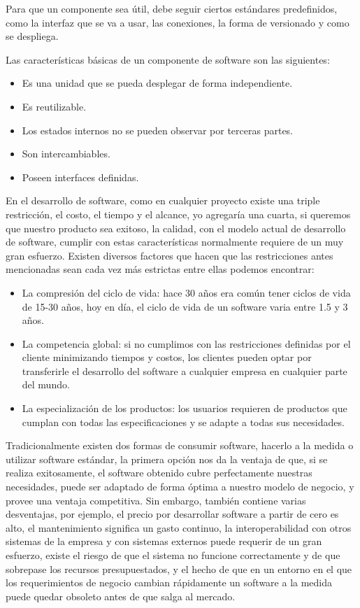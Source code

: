 \documentclass[12pt,a4paper,spanish,openany]{book}
\begin{document}
Para que un componente sea útil, debe seguir ciertos estándares predefinidos,
como la interfaz que se va a usar, las conexiones, la forma de versionado y como
se despliega.

Las características básicas de un componente de software son las siguientes:
\begin{itemize}
  \item Es una unidad que se pueda desplegar de forma independiente.
  \item Es reutilizable.
  \item Los estados internos no se pueden observar por terceras partes.
  \item Son intercambiables.
  \item Poseen interfaces definidas.
\end{itemize}




En el desarrollo de software, como en cualquier proyecto existe una triple
restricción, el costo, el tiempo y el alcance, yo agregaría una cuarta, si
queremos que nuestro producto sea exitoso, la calidad, con el modelo actual de
desarrollo de software, cumplir con estas características normalmente requiere
de un muy gran esfuerzo. Existen diversos factores que hacen que las restricciones
antes mencionadas  sean cada vez más estrictas entre ellas podemos encontrar:
\begin{itemize}
  \item La compresión del ciclo de vida: hace 30 años era común tener
  ciclos de vida de 15-30 años, hoy en día, el ciclo de vida de un software
  varia entre 1.5 y 3 años.
  \item La competencia global: si no cumplimos con las restricciones definidas
  por el cliente minimizando tiempos y costos, los clientes pueden optar por
  transferirle el desarrollo del software a cualquier empresa en cualquier
  parte del mundo.
  \item La especialización de los productos: los usuarios requieren de productos
  que cumplan con todas las especificaciones y se adapte a todas sus
  necesidades.
\end{itemize}

Tradicionalmente existen dos formas de consumir software, hacerlo a la medida o
utilizar software estándar, la primera opción nos da la ventaja de que, si se
realiza exitosamente, el software obtenido cubre perfectamente nuestras
necesidades, puede ser adaptado de forma óptima a nuestro modelo de negocio, y
provee una ventaja competitiva. Sin embargo, también contiene varias
desventajas, por ejemplo, el precio por desarrollar software a partir de cero es alto, el
mantenimiento significa un gasto continuo, la interoperabilidad con otros
sistemas de la empresa y con sistemas externos puede requerir de un gran
esfuerzo, existe el riesgo de que el sistema no funcione correctamente y de que
sobrepase los recursos presupuestados, y el hecho de que en un entorno en el que los requerimientos de negocio cambian rápidamente un
software a la medida puede quedar obsoleto antes de que salga al mercado.
\end{document}

